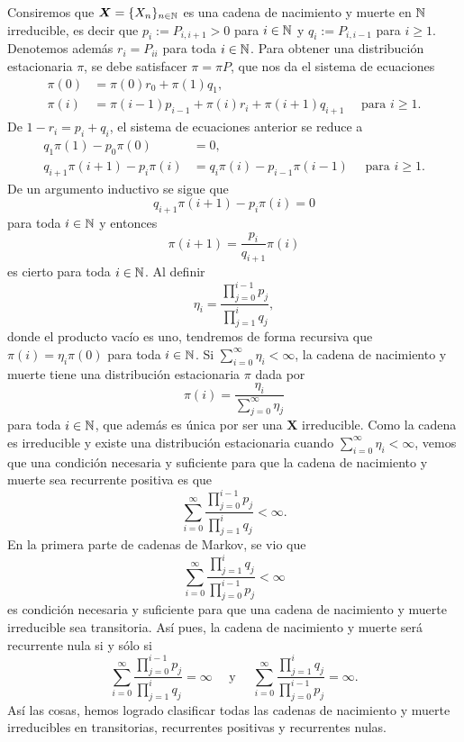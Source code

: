 \begin{example} \label{ej:nym infinita}
    Consiremos que $\bm X = \{X_n\}_{n \in \mathbb{N}}$ es una cadena de nacimiento y muerte en $\mathbb{N}$ irreducible, es decir que $p_i := P_{i,i+1} > 0$ para $i \in \mathbb{N}$ y $q_i := P_{i,i-1}$ para $i \geq 1$. Denotemos además $r_i = P_{ii}$ para toda $i \in \mathbb{N}$. Para obtener una distribución estacionaria $\pi$, se debe satisfacer $\pi = \pi P$, que nos da el sistema de ecuaciones
    \begin{align*}
        \pi(0) & = \pi(0) r_0 + \pi(1) q_1, \\
        \pi(i) & = \pi(i-1) p_{i-1} + \pi(i) r_i + \pi(i+1) q_{i+1} \quad \text{ para } i \geq 1.
    \end{align*}
    De $1 - r_i = p_i + q_i$, el sistema de ecuaciones anterior se reduce a 
    \begin{align*}
        q_1 \pi(1) - p_0 \pi(0)  & = 0, \\
        q_{i+1} \pi(i+1) - p_i \pi(i) & = q_i \pi(i) - p_{i-1} \pi(i-1) \quad \text{ para } i \geq 1.
    \end{align*}
    De un argumento inductivo se sigue que 
    \[
        q_{i+1} \pi(i+1) - p_i \pi(i) = 0 
    \] para toda $i \in \mathbb{N}$ y entonces 
    \[
        \pi(i+1) = \frac{p_i}{q_{i+1}} \pi(i)    
    \]
    es cierto para toda $i \in \mathbb{N}$. Al definir 
    \[
        \eta_i = \frac{\prod_{j = 0}^{i-1} p_j }{ \prod_{j = 1}^i q_j },    
    \] donde el producto vacío es uno, tendremos de forma recursiva que $\pi(i) = \eta_i \pi(0)$ para toda $i \in \mathbb{N}$. Si $\sum_{i = 0}^\infty \eta_i < \infty$, la cadena de nacimiento y muerte tiene una distribución estacionaria $\pi$ dada por 
    \[
        \pi(i) = \frac{\eta_i}{\sum_{j = 0}^\infty \eta_j}
    \]
    para toda $i \in \mathbb{N}$, que además es única por ser una $\bm X$ irreducible. Como la cadena es irreducible y existe una distribución estacionaria cuando $\sum_{i = 0}^\infty \eta_i < \infty$, vemos que una condición necesaria y suficiente para que la cadena de nacimiento y muerte sea recurrente positiva es que 
    \[
        \sum_{i = 0}^\infty \frac{\prod_{j = 0}^{i-1} p_j }{ \prod_{j = 1}^i q_j } < \infty.
    \] En la primera parte de cadenas de Markov, se vio que
    \[
        \sum_{i = 0}^\infty \frac{\prod_{j = 1}^i q_j }{ \prod_{j = 0}^{i-1} p_j } < \infty
    \] es condición necesaria y suficiente para que una cadena de nacimiento y muerte irreducible sea transitoria. Así pues, la cadena de nacimiento y muerte será recurrente nula si y sólo si 
    \[
        \sum_{i = 0}^\infty \frac{\prod_{j = 0}^{i-1} p_j }{ \prod_{j = 1}^i q_j } = \infty \quad \text{ y } \quad \sum_{i = 0}^\infty \frac{\prod_{j = 1}^i q_j }{ \prod_{j = 0}^{i-1} p_j } = \infty.
    \]
    Así las cosas, hemos logrado clasificar todas las cadenas de nacimiento y muerte irreducibles en transitorias, recurrentes positivas y recurrentes nulas.
\end{example}

